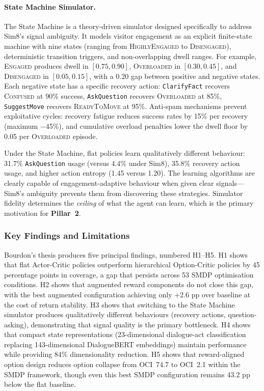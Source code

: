 \documentclass[a4paper, 11pt]{article}
\newcommand{\pillar}[1]{\textbf{Pillar~#1}}
\begin{document}
\paragraph{State Machine Simulator.} The State Machine is a theory-driven simulator designed specifically to address Sim8's signal ambiguity. It models visitor engagement as an explicit finite-state machine with nine states (ranging from \textsc{HighlyEngaged} to \textsc{Disengaged}), deterministic transition triggers, and non-overlapping dwell ranges. For example, \textsc{Engaged} produces dwell in $[0.75, 0.90]$, \textsc{Overloaded} in $[0.30, 0.45]$, and \textsc{Disengaged} in $[0.05, 0.15]$, with a 0.20 gap between positive and negative states. Each negative state has a specific recovery action: \texttt{ClarifyFact} recovers \textsc{Confused} at 90\% success, \texttt{AskQuestion} recovers \textsc{Overloaded} at 85\%, \texttt{SuggestMove} recovers \textsc{ReadyToMove} at 95\%. Anti-spam mechanisms prevent exploitative cycles: recovery fatigue reduces success rates by 15\% per recovery (maximum $-$45\%), and cumulative overload penalties lower the dwell floor by 0.05 per \textsc{Overloaded} episode.

Under the State Machine, flat policies learn qualitatively different behaviour: 31.7\% \texttt{AskQuestion} usage (versus 4.4\% under Sim8), 35.8\% recovery action usage, and higher action entropy (1.45 versus 1.20). The learning algorithms are clearly capable of engagement-adaptive behaviour when given clear signals---Sim8's ambiguity prevents them from discovering these strategies. Simulator fidelity determines the \emph{ceiling} of what the agent can learn, which is the primary motivation for \pillar{2}.

\subsubsection{Key Findings and Limitations}

Bourdon's thesis produces five principal findings, numbered H1--H5. H1 shows that flat Actor-Critic policies outperform hierarchical Option-Critic policies by 45 percentage points in coverage, a gap that persists across 53 SMDP optimisation conditions. H2 shows that augmented reward components do not close this gap, with the best augmented configuration achieving only +2.6 pp over baseline at the cost of return stability. H3 shows that switching to the State Machine simulator produces qualitatively different behaviours (recovery actions, question-asking), demonstrating that signal quality is the primary bottleneck. H4 shows that compact state representations (23-dimensional dialogue-act classification replacing 143-dimensional DialogueBERT embeddings) maintain performance while providing 84\% dimensionality reduction. H5 shows that reward-aligned option design reduces option collapse from OCI~74.7 to OCI~2.1 within the SMDP framework, though even this best SMDP configuration remains 43.2 pp below the flat baseline.
\end{document}

